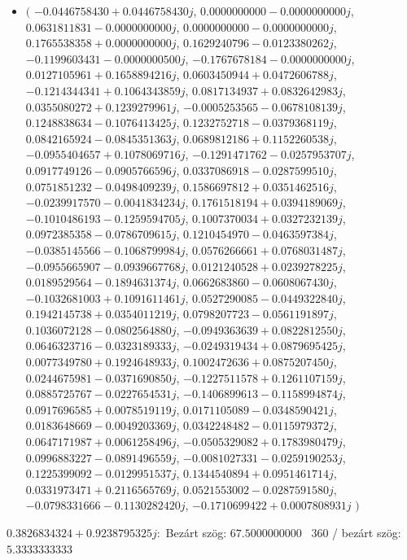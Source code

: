\documentclass[14pt,a4paper]{article}
\begin{document}
\begin{itemize}
\item
$\big($
$-0.0446758430+0.0446758430j$, $0.0000000000-0.0000000000j$, $0.0631811831-0.0000000000j$, $0.0000000000-0.0000000000j$, $0.1765538358+0.0000000000j$, $0.1629240796-0.0123380262j$, $-0.1199603431-0.0000000500j$, $-0.1767678184-0.0000000000j$, $0.0127105961+0.1658894216j$, $0.0603450944+0.0472606788j$, $-0.1214344341+0.1064343859j$, $0.0817134937+0.0832642983j$, $0.0355080272+0.1239279961j$, $-0.0005253565-0.0678108139j$, $0.1248838634-0.1076413425j$, $0.1232752718-0.0379368119j$, $0.0842165924-0.0845351363j$, $0.0689812186+0.1152260538j$, $-0.0955404657+0.1078069716j$, $-0.1291471762-0.0257953707j$, $0.0917749126-0.0905766596j$, $0.0337086918-0.0287599510j$, $0.0751851232-0.0498409239j$, $0.1586697812+0.0351462516j$, $-0.0239917570-0.0041834234j$, $0.1761518194+0.0394189069j$, $-0.1010486193-0.1259594705j$, $0.1007370034+0.0327232139j$, $0.0972385358-0.0786709615j$, $0.1210454970-0.0463597384j$, $-0.0385145566-0.1068799984j$, $0.0576266661+0.0768031487j$, $-0.0955665907-0.0939667768j$, $0.0121240528+0.0239278225j$, $0.0189529564-0.1894631374j$, $0.0662683860-0.0608067430j$, $-0.1032681003+0.1091611461j$, $0.0527290085-0.0449322840j$, $0.1942145738+0.0354011219j$, $0.0798207723-0.0561191897j$, $0.1036072128-0.0802564880j$, $-0.0949363639+0.0822812550j$, $0.0646323716-0.0323189333j$, $-0.0249319434+0.0879695425j$, $0.0077349780+0.1924648933j$, $0.1002472636+0.0875207450j$, $0.0244675981-0.0371690850j$, $-0.1227511578+0.1261107159j$, $0.0885725767-0.0227654531j$, $-0.1406899613-0.1158994874j$, $0.0917696585+0.0078519119j$, $0.0171105089-0.0348590421j$, $0.0183648669-0.0049203369j$, $0.0342248482-0.0115979372j$, $0.0647171987+0.0061258496j$, $-0.0505329082+0.1783980479j$, $0.0996883227-0.0891496559j$, $-0.0081027331-0.0259190253j$, $0.1225399092-0.0129951537j$, $0.1344540894+0.0951461714j$, $0.0331973471+0.2116565769j$, $0.0521553002-0.0287591580j$, $-0.0798331666-0.1130282420j$, $-0.1710699422+0.0007808931j$
$\big)$
\end{itemize}
$0.3826834324+0.9238795325j$:\
Bezárt szög: $67.5000000000$ \
360 / bezárt szög: $5.3333333333$\
\end{document}
